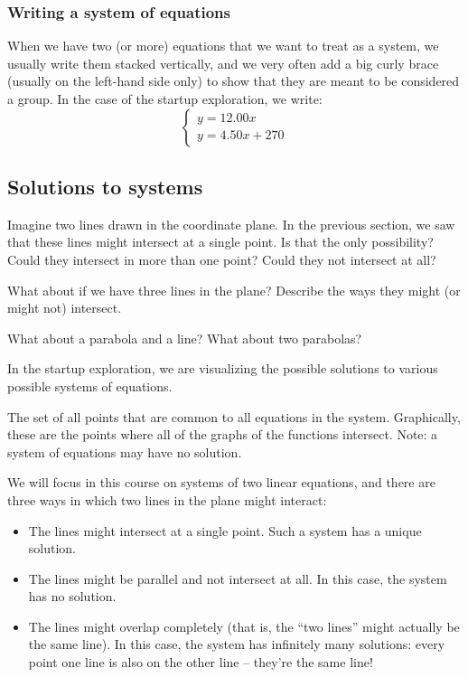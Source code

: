 \subsubsection{Writing a system of equations}

When we have two (or more) equations that we want to treat as a system, we usually write them stacked vertically, and we very often add a big curly brace (usually on the left-hand side only) to show that they are meant to be considered a group. In the case of the startup exploration, we write: \[\left\{\begin{array}{l}y=12.00x\\y=4.50x+270\end{array}\right.\]

\subsection{Solutions to systems}

\begin{boxedexplore}
Imagine two lines drawn in the coordinate plane. In the previous section, we saw that these lines might intersect at a single point. Is that the only possibility? Could they intersect in more than one point? Could they not intersect at all?

What about if we have three lines in the plane? Describe the ways they might (or might not) intersect.

What about a parabola and a line? What about two parabolas?
\end{boxedexplore}


In the startup exploration, we are visualizing the possible solutions to various possible systems of equations.

\begin{boxeddef}
The set of all points that are common to all equations in the system. Graphically, these are the points where all of the graphs of the functions intersect. Note: a system of equations may have no solution.
\end{boxeddef}

We will focus in this course on systems of two linear equations, and there are three ways in which two lines in the plane might interact:
\begin{itemize}
\item The lines might intersect at a single point. Such a system has a unique solution.

\item The lines might be parallel and not intersect at all. In this case, the system has no solution.

\item The lines might overlap completely (that is, the ``two lines'' might actually be the same line). In this case, the system has infinitely many solutions: every point one line is also on the other line -- they're the same line!
\end{itemize}

